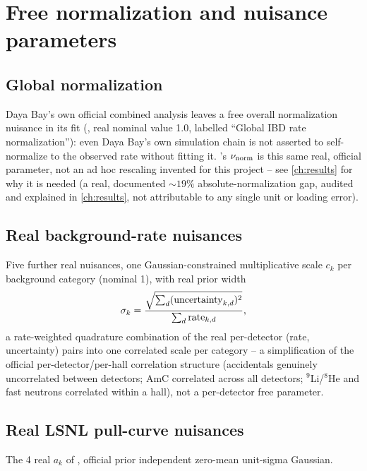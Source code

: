 \section{Free normalization and nuisance parameters}
\label{sec:nuisances}

\begin{theorybox}
\subsection*{Global normalization}
Daya Bay's own official combined analysis leaves a free overall
normalization nuisance in its fit (,
real nominal value 1.0, labelled ``Global IBD rate normalization''): even
Daya Bay's own simulation chain is not asserted to self-normalize to the
observed rate without fitting it. 's
$\nu_{\rm norm}$ is this same real, official parameter, not an ad hoc
rescaling invented for this project -- see \cref{ch:results} for why it is
needed (a real, documented $\sim19\%$ absolute-normalization gap, audited
and explained in \cref{ch:results}, not attributable to any single unit or
loading error).

\subsection*{Real background-rate nuisances}
Five further real nuisances, one Gaussian-constrained multiplicative scale
$c_k$ per background category (nominal 1), with real prior width
\begin{equation}
  \sigma_k = \frac{\sqrt{\sum_d ({\rm uncertainty}_{k,d})^2}}{\sum_d {\rm rate}_{k,d}},
  \label{eq:background-sigma}
\end{equation}
a rate-weighted quadrature combination of the real per-detector
(rate, uncertainty) pairs into one correlated scale per category -- a
simplification of the official per-detector/per-hall correlation structure
(accidentals genuinely uncorrelated between detectors; AmC correlated
across all detectors; $^9$Li/$^8$He and fast neutrons correlated within a
hall), not a per-detector free parameter.

\subsection*{Real LSNL pull-curve nuisances}
The 4 real $a_k$ of , official prior
independent zero-mean unit-sigma Gaussian.
\end{theorybox}

